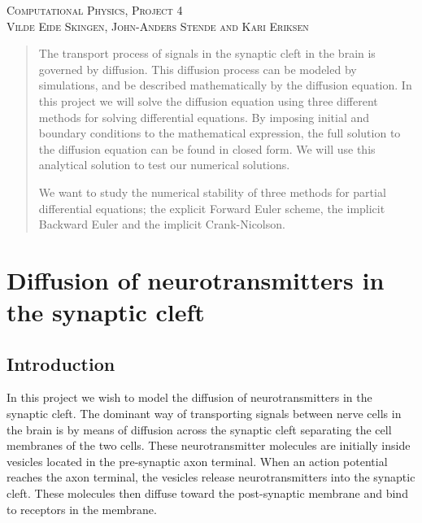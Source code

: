 \documentclass[a4paper,12pt, english]{article}
\begin{document}
\begin{titlepage}
\begin{center}
\textsc{\Large Computational Physics, Project 4}\\[0.5cm]
\textsc{Vilde Eide Skingen, John-Anders Stende and Kari Eriksen}\\[0.5cm]

\end{center}
\end{titlepage}

\begin{abstract}

The transport process of signals in the synaptic cleft in the brain is governed by diffusion. This diffusion process can be modeled by simulations, and be described mathematically by the diffusion equation. In this project we will solve the diffusion equation using three different methods for solving differential equations. By imposing initial and boundary conditions to the mathematical expression, the full solution to the diffusion equation can be found in closed form. We will use this analytical solution to test our numerical solutions. 

We want to study the numerical stability of three methods for partial differential equations; the explicit Forward Euler scheme, the implicit Backward Euler and the implicit Crank-Nicolson.

\end{abstract}

\section*{Diffusion of neurotransmitters in the synaptic cleft}

\subsection*{Introduction}
In this project we wish to model the diffusion of neurotransmitters in the synaptic cleft. 
The dominant way of transporting signals between nerve cells in the brain is by means of diffusion across the synaptic cleft separating the cell membranes of the two cells. 
These neurotransmitter molecules are initially inside vesicles located in the pre-synaptic axon terminal. When an action potential reaches the axon terminal, the vesicles release neurotransmitters into the synaptic cleft. These molecules then diffuse toward the post-synaptic membrane and bind to receptors in the membrane. 
\end{document}
